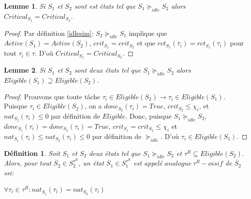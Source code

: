 \documentclass[a4paper]{report}
\theoremstyle{break}
\newtheorem{defin}{Définition}
\theoremstyle{breakplain}
\newtheorem{lem}{Lemme}
\begin{document}
\begin{lem}
\label{criteq}
Si $S_1$ et $S_2$ sont est états tel que $S_1 \succeq_{idle} S_2$ alors $Critical_{S_1} = Critical_{S_2}$.
\end{lem}
\begin{proof} Par définition \ref{idlesim}: $S_2 \succeq_{idle} S_1$ implique que $Active(S_1) = Active(S_2)$, $crit_{S_1} = crit_{S_2}$ et que $rct_{S_1}(\tau_i) = rct_{S_1}(\tau_i)$ pour tout $\tau_i \in \tau$. D'où $Critical_{S_1} = Critical_{S_2}$.
\end{proof}





\begin{lem}
\label{elisuper}
Si $S_1$ et $S_2$ sont deux états tel que $S_1 \succeq_{idle}S_2$ alors $Eligible(S_1) \supseteq Eligible(S_2)$.
\end{lem}
\begin{proof} Prouvons que toute tâche $\tau_i \in Eligible(S_2) \rightarrow \tau_i \in Eligible(S_1)$. Puisque $\tau_i \in Eligible(S_2)$, on a $done_{S_2}(\tau_i) = True$,  $crit_{S_2} \leq \chi_i$, et $nat_{S_2}(\tau_i) \leq 0$ par définition de $Eligible$. Donc, puisque $S_1 \succeq_{idle}S_2$, $done_{S_1}(\tau_i) = done_{S_2}(\tau_i) = True$,  $crit_{S_1} = crit_{S_2} \leq \chi_i$ et $nat_{S_1}(\tau_i) \leq nat_{S_2}(\tau_i) \leq 0$ par définition de $\succeq_{idle}$. D'où $\tau_i \in Eligible(S_1)$.
\end{proof}

\begin{defin}
\label{reqanalogue}
Soit $S_1$ et $S_2$ deux états tel que $S_1 \succeq_{idle}S_2$ et $\tau^R \subseteq Eligible(S_2)$. Alors, pour tout $\overline{S}_2\in S_2^{\tau^R}$, un état  $\overline{S}_1\in S_1^{\tau^R}$ est appelé $analogue\ \tau^R-oisif$ de $\overline{S}_2$ ssi:
\begin{center}
$\forall \tau_i \in \tau^R : nat_{\overline{S}_1}(\tau_i) = nat_{\overline{S}_2}(\tau_i) $
\end{center}
\end{defin}
\end{document}
